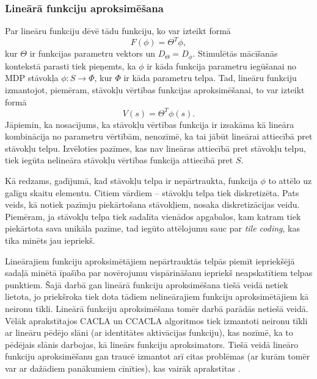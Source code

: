 \documentclass{ludis} %
\begin{document}
\subsubsection{Lineārā funkciju aproksimēšana}
Par lineāru funkciju dēvē tādu funkciju, ko var izteikt formā
\[
	F(\phi) = \Theta^T \phi,
\]
kur $\Theta$ ir funkcijas parametru vektors un $D_\Theta = D_\phi$.
Stimulētās mācīšanās kontekstā parasti tiek pieņemts, ka $\phi$ ir kāda funkcija
parametru iegūšanai no MDP stāvokļa $\phi : S \rightarrow \Phi$, kur $\Phi$ ir kāda
parametru telpa. Tad, lineāru funkciju izmantojot, piemēram, stāvokļu vērtības
funkcijas aproksimēšanai, to var izteikt formā
\[
	V(s) = \Theta^T \phi(s).
\]
Jāpiemin, ka nosacījums, ka stāvokļu vērtības funkcija ir izsakāma kā lineāra
kombinācija no parametru vērtībām, nenozīmē, ka tai jābūt lineārai attiecībā
pret stāvokļu telpu. Izvēloties pazīmes, kas nav lineāras attiecībā pret stāvokļu
telpu, tiek iegūta nelineāra stāvokļu vērtības funkcija attiecībā pret $S$.

Kā redzams, gadījumā, kad stāvokļu telpa ir nepārtraukta, funkcija $\phi$ to
attēlo uz galīgu skaitu elementu. Citiem vārdiem -- stāvokļu telpa tiek
diskretizēta. Pats veids, kā notiek pazīmju piekārtošana stāvokļiem, nosaka
diskretizācijas veidu. Piemēram, ja stāvokļu telpa tiek sadalīta vienādos
apgabalos, kam katram tiek piekārtota sava unikāla pazīme, tad iegūto attēlojumu
sauc par \textit{tile coding}, kas tika minēts jau iepriekš.

Lineārajiem funkciju aproksimētājiem nepārtrauktās telpās piemīt iepriekšējā
sadaļā minētā īpašība par novērojumu vispārināšanu iepriekš neapskatītiem telpas
punktiem. Šajā darbā gan lineārā funkciju aproksimēšana tiešā veidā netiek
lietota, jo priekšroka tiek dota tādiem nelineārajiem funkciju aproksimētājiem
kā neironu tīkli. Lineārā funkciju aproksimēšana tomēr darbā parādās netiešā
veidā. Vēlāk aprakstītajos CACLA un CCACLA algoritmos tiek izmantoti neironu
tīkli ar lineāru pēdējo slāni (ar identitātes aktivācijas funkciju), kas nozīmē,
ka to pēdējais slānis darbojas, kā lineārs funkciju aproksimators. Tiešā veidā
lineāro funkciju aproksimēšanu gan traucē izmantot arī citas problēmas (ar kurām
tomēr var ar dažādiem panākumiem cīnīties), kas vairāk aprakstītas
\autocite{Hasselt2012}.
\end{document}
